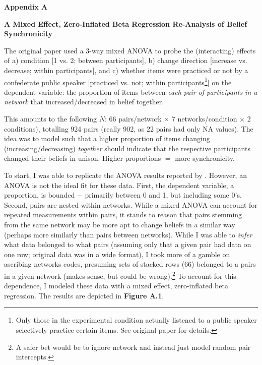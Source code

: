 \documentclass[12pt]{article}  %
\begin{document}

\printbibliography[heading=none]


\newpage

\begin{center}
    \textbf{Appendix A}
    
    \textbf{A Mixed Effect, Zero-Inflated Beta Regression Re-Analysis of Belief Synchronicity}
\end{center}

The original paper used a 3-way mixed ANOVA to probe the (interacting) effects of a) condition [1 vs. 2; between participants], b) change direction [increase vs. decrease; within participants], and c) whether items were practiced or not by a confederate public speaker [practiced vs. not; within participants\footnote{Only those in the experimental condition actually listened to a public speaker selectively practice certain items. See original paper for details.}] on the dependent variable: the proportion of items between \textit{each pair of participants in a network} that increased/decreased in belief together.

This amounts to the following $N$: 66 pairs/network $\times$ 7 networks/condition $\times$ 2 conditions), totalling 924 pairs (really 902, as 22 pairs had only NA values). The idea was to model  such that a higher proportion of items changing (increasing/decreasing) \textit{together} should indicate that the respective participants changed their beliefs in unison. Higher proportions $=$ more synchronicity.

To start, I was able to replicate the ANOVA results reported by \textcite{vlasceanu_synchronization_2020}. However, an ANOVA is not the ideal fit for these data. First, the dependent variable, a proportion, is bounded $-$ primarily between 0 and 1, but including some 0's. Second, pairs are nested within networks. While a mixed ANOVA can account for repeated measurements within pairs, it stands to reason that pairs stemming from the same network may be more apt to change beliefs in a similar way (perhaps more similarly than pairs between networks). While I was able to \textit{infer} what data belonged to what pairs (assuming only that a given pair had data on one row; original data was in a wide format), I took more of a gamble on ascribing networks codes, presuming sets of stacked rows (66) belonged to a pairs in a given network (makes sense, but could be wrong).\footnote{A safer bet would be to ignore network and instead just model random pair intercepts.} To account for this dependence, I modeled these data with a mixed effect, zero-inflated beta regression. The results are depicted in \textbf{Figure A.1}.
\end{document}
